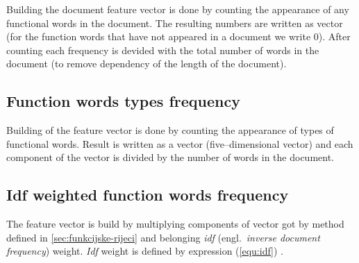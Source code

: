 \documentclass[11pt,english]{article}
\newcommand{\engl}[1]{(engl.~\emph{#1})}
\begin{document}
\begin{multicols}{2}
Building the document feature vector is done by counting the appearance of any
functional words in the document. The resulting numbers are written as vector
(for the function words that have not appeared in a document we write 0). After
counting each frequency is devided with the total number of words in the document
(to remove dependency of the length of the document).

\subsection{Function words types frequency}
\label{sec:funkcijske-rijeci-grupe}
% 

Building of the feature vector is done by counting the appearance of
types of functional words. Result is written as a vector (five--dimensional
vector) and each component of the vector is divided by the number of words in
the document.


\subsection{Idf weighted function words frequency}
\label{sec:funkcijske-rijeci-idf}
The feature vector is build by multiplying components of vector got by method
defined in \ref{sec:funkcijske-rijeci} and belonging \emph{idf} \engl{inverse
document frequency} weight. \emph{Idf} weight is defined by expression
(\ref{equ:idf}) \citep{diederich2003authorship}.


\end{multicols}
\end{document}
